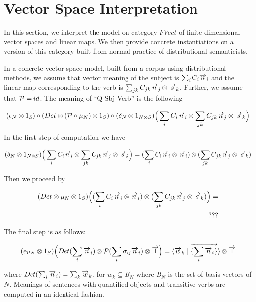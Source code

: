 \section{Vector Space Interpretation}


In this section, we interpret the model on category $FVect$ of finite dimensional vector spaces and linear maps. We then provide concrete instantiations on a version of this category built from normal practice of distributional semanticists. 

In a concrete vector space model, built from a corpus using distributional methods, we assume that  vector meaning of the subject is $\sum_i C_i \overrightarrow{n}_i$ and the linear map corresponding to the verb is $\sum_{jk} C_{jk} \overrightarrow{n}_j \otimes \overrightarrow{s}_k$. Further, we assume that ${\cal P} = id$. The meaning of ``Q Sbj Verb'' is  the following

\[
(\epsilon_N \otimes 1_S) \circ (Det \otimes ({\cal P} \circ \mu_N) \otimes 1_S) \circ (\delta_N \otimes 1_{N \otimes S})\Big(\sum_i C_i \overrightarrow{n}_i \otimes \sum_{jk} C_{jk} \overrightarrow{n}_j \otimes \overrightarrow{s}_k\Big)
\]
In the first step of computation we have

\begin{align*}
(\delta_N \otimes 1_{N \otimes S})\Big(\sum_i C_i \overrightarrow{n}_i \otimes \sum_{jk} C_{jk} \overrightarrow{n}_j \otimes \overrightarrow{s}_k\Big) = 
(\sum_i C_i \overrightarrow{n}_i \otimes \overrightarrow{n}_i) \otimes  (\sum_{jk} C_{jk} \overrightarrow{n}_j \otimes \overrightarrow{s}_k)
\end{align*}

\noindent
Then we proceed by

\begin{align*}
(Det \otimes  \mu_N \otimes 1_S)\Big((\sum_i C_i \overrightarrow{n}_i \otimes \overrightarrow{n}_i) \otimes  (\sum_{jk} C_{jk} \overrightarrow{n}_j \otimes \overrightarrow{s}_k)\Big) = \\
???
\end{align*}

\noindent
The final step is as follows:

\begin{align*}
(\epsilon_{{\cal P} N} \otimes 1_S)  \Big(Det(\sum_i \overrightarrow{n}_i) \otimes {\cal P}(\sum_i \sigma_{ij} \overrightarrow{n}_i) \otimes \overrightarrow{1} \Big) =   \langle \overrightarrow{w}_k \mid \overrightarrow{\{\sum_i \overrightarrow{n}_i\}} \rangle  \otimes \overrightarrow{1}
\end{align*}

\noindent 
where $Det (\sum_i \overrightarrow{n}_i) = \sum_k \overrightarrow{w}_k$, for $w_k \subseteq B_N$ where $B_N$ is the set of basis vectors of $N$.  Meanings of sentences with quantified objects and transitive verbs are computed in an identical fashion. 







